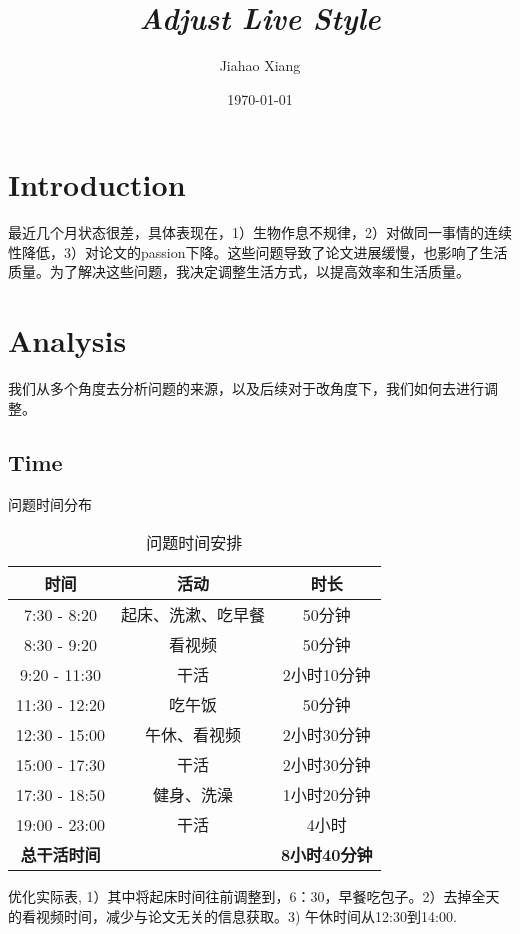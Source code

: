 \documentclass{article}
\title{\textit{Adjust Live Style}}
\author{Jiahao Xiang}
\date{\today}
\begin{document}
\maketitle

\section{Introduction}
最近几个月状态很差，具体表现在，1）生物作息不规律，2）对做同一事情的连续性降低，3）对论文的passion下降。这些问题导致了论文进展缓慢，也影响了生活质量。为了解决这些问题，我决定调整生活方式，以提高效率和生活质量。


\section{Analysis}
我们从多个角度去分析问题的来源，以及后续对于改角度下，我们如何去进行调整。
\subsection{Time}

问题时间分布

\begin{table}[h]
    \centering
    \caption{问题时间安排}
    \label{tab:daily_schedule}
    \begin{tabular}{|c|c|c|}
        \hline
        时间 & 活动 & 时长 \\ \hline
        7:30 - 8:20 & 起床、洗漱、吃早餐 & 50分钟 \\ \hline
        8:30 - 9:20 & 看视频 & 50分钟 \\ \hline
        9:20 - 11:30 & 干活 & 2小时10分钟 \\ \hline
        11:30 - 12:20 & 吃午饭 & 50分钟 \\ \hline
        12:30 - 15:00 & 午休、看视频 & 2小时30分钟 \\ \hline
        15:00 - 17:30 & 干活 & 2小时30分钟 \\ \hline
        17:30 - 18:50 & 健身、洗澡 & 1小时20分钟 \\ \hline
        19:00 - 23:00 & 干活 & 4小时 \\ \hline
        \hline
        \textbf{总干活时间} & & \textbf{8小时40分钟} \\ \hline
    \end{tabular}
  
\end{table}

优化实际表, 1）其中将起床时间往前调整到，6：30，早餐吃包子。2）去掉全天的看视频时间，减少与论文无关的信息获取。3) 午休时间从12:30到14:00.
\end{document}
